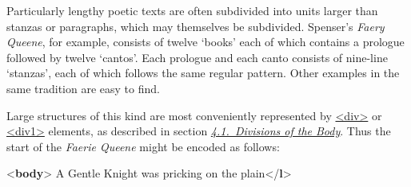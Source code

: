 Particularly lengthy poetic texts are often subdivided into units larger than stanzas or paragraphs, which may themselves be subdivided. Spenser's \textit{Faery Queene}, for example, consists of twelve ‘books’ each of which contains a prologue followed by twelve ‘cantos’. Each prologue and each canto consists of nine-line ‘stanzas’, each of which follows the same regular pattern. Other examples in the same tradition are easy to find.\par
Large structures of this kind are most conveniently represented by \hyperref[TEI.div]{<div>} or \hyperref[TEI.div1]{<div1>} elements, as described in section \textit{\hyperref[DSDIV]{4.1.\ Divisions of the Body}}. Thus the start of the \textit{Faerie Queene} might be encoded as follows: \par\bgroup{}\exampleFont \begin{shaded}\noindent\mbox{}{<\textbf{body}>}\mbox{}\newline 
{}\mbox{}\newline 
\hspace*{1em}\mbox{}\newline 
\hspace*{1em}\hspace*{1em}\mbox{}\newline 
\hspace*{1em}\hspace*{1em}\hspace*{1em}A Gentle Knight was pricking on the plain{</\textbf{l}>}\mbox{}\newline 

\end{shaded}
